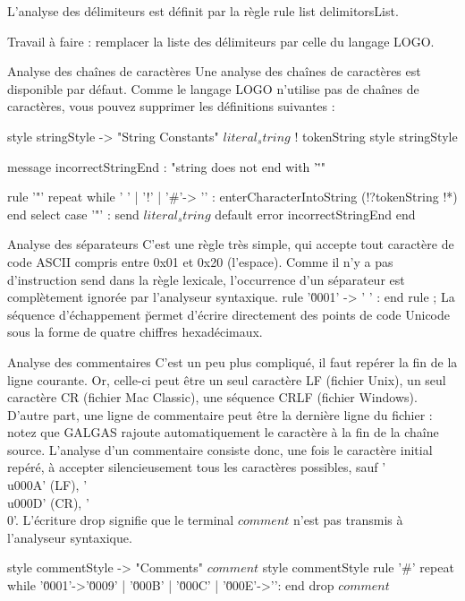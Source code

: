 L'analyse des délimiteurs est définit par la règle rule list delimitorsList.

Travail à faire : remplacer la liste des délimiteurs par celle du langage LOGO.

Analyse des chaînes de caractères
Une analyse des chaînes de caractères est disponible par défaut. Comme le langage LOGO n’utilise pas de chaînes de caractères, vous pouvez supprimer les définitions suivantes :

\begin{galgascode}
style stringStyle -> "String Constants"
$literal_string$ ! tokenString style stringStyle %

message incorrectStringEnd : "string does not end with '\"'"

rule '"' {
  repeat
  while ' ' | '!' | '#'-> '\uFFFD' :
    enterCharacterIntoString (!?tokenString !*)
  end
  select
  case '"' :
    send $literal_string$
  default
    error incorrectStringEnd
  end
}
\end{galgascode}

Analyse des séparateurs
C'est une règle très simple, qui accepte tout caractère de code ASCII compris entre 0x01 et 0x20 (l'espace). Comme il n'y a pas d'instruction send dans la règle lexicale, l'occurrence d'un séparateur est complètement ignorée par l'analyseur syntaxique.
rule '\u0001' -> ' ' :
end rule ;
La séquence d'échappement \u permet d'écrire directement des points de code Unicode sous la forme de quatre chiffres hexadécimaux.

Analyse des commentaires
C'est un peu plus compliqué, il faut repérer la fin de la ligne courante. Or, celle-ci peut être un seul caractère LF (fichier Unix), un seul caractère CR (fichier Mac Classic), une séquence CRLF (fichier Windows). D'autre part, une ligne de commentaire peut être la dernière ligne du fichier : notez que GALGAS rajoute automatiquement le caractère  à la fin de la chaîne source. L'analyse d'un commentaire consiste donc, une fois le caractère initial  repéré, à accepter silencieusement tous les caractères possibles, sauf '\\u000A' (LF), '\\u000D' (CR), '\\0'. L’écriture drop  signifie que le terminal $comment$ n’est pas transmis à l’analyseur syntaxique.

\begin{galgascode}
style commentStyle -> "Comments"
$comment$ style commentStyle %
rule '#' {
  repeat
  while '\u0001'->'\u0009' | '\u000B' | '\u000C' | '\u000E'->'\uFFFD':
  end
  drop $comment$
}
\end{galgascode}

